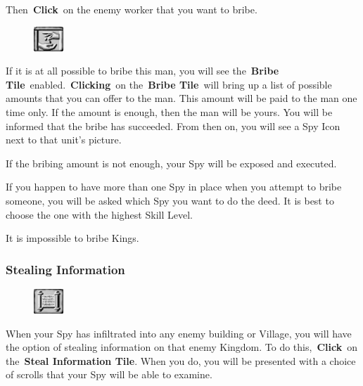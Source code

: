 Then \textbf{Click} on the enemy worker that you want to bribe.

\begin{figure}
	\vspace{-20pt}
	\begin{center}
		\includegraphics[width=0.1\textwidth]{Tbribe}
	\end{center}
	\vspace{-20pt}
\end{figure}

If it is at all possible to bribe this man, you will see the \textbf{Bribe Tile} enabled. \textbf{Clicking} on the \textbf{Bribe Tile} will bring up a list of possible amounts that you can offer to the man. This amount will be paid to the man one time only. If the amount is enough, then the man will be yours. You will be informed that the bribe has succeeded. From then on, you will see a Spy Icon next to that unit’s picture.

If the bribing amount is not enough, your Spy will be exposed and executed.

If you happen to have more than one Spy in place when you attempt to bribe someone, you will be asked which Spy you want to do the deed. It is best to choose the one with the highest Skill Level.

It is impossible to bribe Kings.

\subsubsection{Stealing Information}

\begin{figure}
	\vspace{-20pt}
	\begin{center}
		\includegraphics[width=0.1\textwidth]{Tsteal}
	\end{center}
	\vspace{-20pt}
\end{figure}

When your Spy has infiltrated into any enemy building or Village, you will have the option of stealing information on that enemy Kingdom. To do this, \textbf{Click} on the \textbf{Steal Information Tile}. When you do, you will be presented with a choice of scrolls that your Spy will be able to examine.

